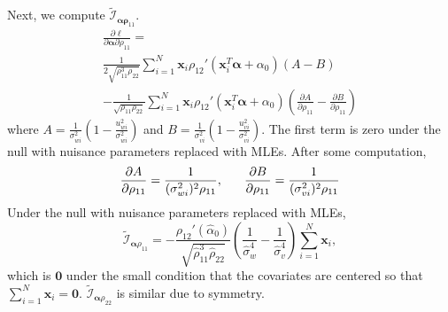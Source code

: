 \documentclass[aap,authoryear, preprint]{imsart}
\numberwithin{equation}{section}
\theoremstyle{plain}
\begin{document}

\noindent Next, we compute $\tilde{\mathcal{I}}_{\bm{\alpha}\bm{\rho}_{11}}$.
\begin{equation}
    \begin{multlined}
    \frac{\partial \ell}{\partial \bm{\alpha}\partial\rho_{11}} = \\
    \frac{1}{2\sqrt{\rho_{11}^3\rho_{22}}} \sum_{i=1}^{N} \bm{x}_i \rho_{12}'(\bm{x}_i^T\bm{\alpha}+\alpha_0) (A-B)\\
    - \frac{1}{\sqrt{\rho_{11}\rho_{22}}} \sum_{i=1}^{N} \bm{x}_i \rho_{12}'(\bm{x}_i^T\bm{\alpha} + \alpha_0) \left( \frac{\partial A}{\partial \rho_{11}} - \frac{\partial B}{\partial \rho_{11}}\right)
    \end{multlined}
    \end{equation}
where $A = \frac{1}{\sigma_{wi}^2} \left( 1 - \frac{u_{wi}^2}{\sigma_{wi}^2}\right)$ and $B = \frac{1}{\sigma_{vi}^2} \left( 1-\frac{u_{vi}^2}{\sigma_{vi}^2}\right)$. The first term is zero under the null with nuisance parameters replaced with MLEs. After some computation,
$$\frac{\partial A}{\partial \rho_{11}} =  \frac{1}{(\sigma_{wi}^2)^2\rho_{11}},\hspace{6mm}
\frac{\partial B}{\partial \rho_{11}} =  \frac{1}{(\sigma_{vi}^2)^2\rho_{11}}$$
Under the null with nuisance parameters replaced with MLEs,
$$\tilde{\mathcal{I}}_{\bm{\alpha}\rho_{11}} = 
-\frac{\rho_{12}'(\hat{\alpha}_0)}{\sqrt{\hat{\rho}_{11}^3\hat{\rho}_{22}}} \left(\frac{1}{\hat{\sigma}_w^4} - \frac{1}{\hat{\sigma}_v^4} \right)\sum_{i=1}^{N} \bm{x}_i 
,
$$
which is $\bm{0}$ under the small condition that the covariates are centered so that $\sum_{i=1}^{N}\bm{x}_i = \bm{0}$. $\tilde{\mathcal{I}}_{\bm{\alpha}\rho_{22}}$ is similar due to symmetry.\\
\end{document}
